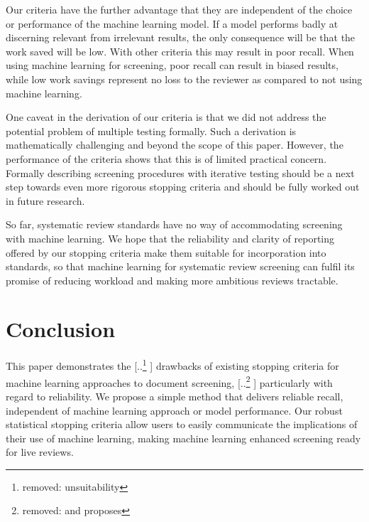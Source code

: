 \documentclass{bmcart}
\providecommand{\DIFadd}[1]{{\protect\color{blue} \sf #1}} %
\providecommand{\DIFdel}[1]{{\protect\color{red} [..\footnote{removed: #1} ]}} %
\providecommand{\DIFaddbegin}{} %
\providecommand{\DIFaddend}{} %
\providecommand{\DIFdelbegin}{} %
\providecommand{\DIFdelend}{} %
\newcommand{\DIFscaledelfig}{0.5}
\newlength{\DIFdelgraphicswidth} %
\newlength{\DIFdelgraphicsheight} %
\newcommand{\DIFaddincludegraphics}[2][]{{\color{blue}\fbox{\DIFOincludegraphics[#1]{#2}}}} %
\newcommand{\DIFdelincludegraphics}[2][]{%
\sbox{\DIFdelgraphicsbox}{\DIFOincludegraphics[#1]{#2}}%
\settoboxwidth{\DIFdelgraphicswidth}{\DIFdelgraphicsbox} %
\settoboxtotalheight{\DIFdelgraphicsheight}{\DIFdelgraphicsbox} %
\scalebox{\DIFscaledelfig}{%
\parbox[b]{\DIFdelgraphicswidth}{\usebox{\DIFdelgraphicsbox}\\[-\baselineskip] \rule{\DIFdelgraphicswidth}{0em}}\llap{\resizebox{\DIFdelgraphicswidth}{\DIFdelgraphicsheight}{%
\setlength{\unitlength}{\DIFdelgraphicswidth}%
\begin{picture}(1,1)%
\thicklines\linethickness{2pt} %
{\color[rgb]{1,0,0}\put(0,0){\framebox(1,1){}}}%
{\color[rgb]{1,0,0}\put(0,0){\line( 1,1){1}}}%
{\color[rgb]{1,0,0}\put(0,1){\line(1,-1){1}}}%
\end{picture}%
}\hspace*{3pt}}} %
} %
\DeclareRobustCommand{\DIFaddbegin}{\DIFOaddbegin \let\includegraphics\DIFaddincludegraphics} %
\DeclareRobustCommand{\DIFaddend}{\DIFOaddend \let\includegraphics\DIFOincludegraphics} %
\DeclareRobustCommand{\DIFdelbegin}{\DIFOdelbegin \let\includegraphics\DIFdelincludegraphics} %
\DeclareRobustCommand{\DIFdelend}{\DIFOaddend \let\includegraphics\DIFOincludegraphics} %
\begin{document}
	Our criteria have the further advantage that they are independent of the choice or performance of the machine learning model. If a model performs badly at discerning relevant from irrelevant results, the only consequence will be that the work saved will be low. With other criteria this may result in poor recall. 
	When using machine learning for screening, poor recall can result in biased results, while low work savings represent no loss to the reviewer as compared to not using machine learning.

	\DIFaddbegin \DIFadd{One caveat in the derivation of our criteria is that we did not address the potential problem of multiple testing formally. Such a derivation is mathematically challenging and beyond the scope of this paper. However, the performance of the criteria shows that this is of limited practical concern. Formally describing screening procedures with iterative testing should be a next step towards even more rigorous stopping criteria and should be fully worked out in future research.
	}

	\DIFaddend So far, systematic review standards have no way of accommodating screening with machine learning. 
	We hope that the reliability and clarity of reporting offered by our stopping criteria make them suitable for incorporation into standards, so that machine learning for systematic review screening can fulfil its promise of reducing workload and making more ambitious reviews tractable.

	\section*{Conclusion}

	This paper demonstrates the \DIFdelbegin \DIFdel{unsuitability }\DIFdelend \DIFaddbegin \DIFadd{drawbacks }\DIFaddend of existing stopping criteria for machine learning approaches to document screening, \DIFdelbegin \DIFdel{and proposes }\DIFdelend \DIFaddbegin \DIFadd{particularly with regard to reliability. We propose }\DIFaddend a simple method that delivers reliable recall, independent of machine learning approach or model performance. Our robust statistical stopping criteria allow users to easily communicate the implications of their use of machine learning, making machine learning enhanced screening ready for live reviews.
\end{document}
